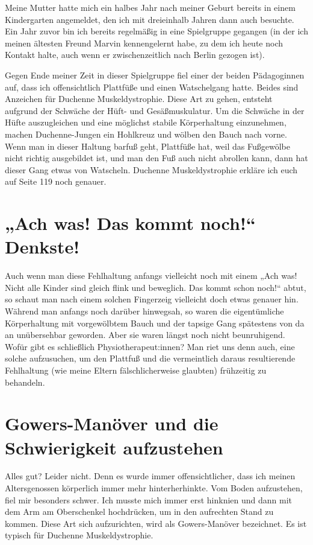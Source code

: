 \documentclass[fontsize=12pt,a4paper,headinclude,DIV=calc,automark]{scrbook}
\begin{document}
Meine Mutter hatte mich ein halbes Jahr nach meiner Geburt bereits in einem Kindergarten angemeldet, den ich mit dreieinhalb Jahren dann auch besuchte. Ein Jahr zuvor bin ich bereits regelmäßig in eine Spielgruppe gegangen (in der ich meinen ältesten Freund Marvin kennengelernt habe, zu dem ich heute noch Kontakt halte, auch wenn er zwischenzeitlich nach Berlin gezogen ist).

Gegen Ende meiner Zeit in dieser Spielgruppe fiel einer der beiden Pädagoginnen auf, dass ich offensichtlich Plattfüße und einen Watschelgang hatte. Beides sind Anzeichen für Duchenne Muskeldystrophie. Diese Art zu gehen, entsteht aufgrund der Schwäche der Hüft- und Gesäßmuskulatur. Um die Schwäche in der Hüfte auszugleichen und eine möglichst stabile Körperhaltung einzunehmen, machen Duchenne-Jungen ein Hohlkreuz und wölben den Bauch nach vorne. Wenn man in dieser Haltung barfuß geht, Plattfüße hat, weil das Fußgewölbe nicht richtig ausgebildet ist, und man den Fuß auch nicht abrollen kann, dann hat dieser Gang etwas von Watscheln. Duchenne Muskeldystrophie erkläre ich euch auf Seite 119 noch genauer.

\section{„Ach was! Das kommt noch!“ Denkste!}

Auch wenn man diese Fehlhaltung anfangs vielleicht noch mit einem „Ach was! Nicht alle Kinder sind gleich flink und beweglich. Das kommt schon noch!“ abtut, so schaut man nach einem solchen Fingerzeig vielleicht doch etwas genauer hin. Während man anfangs noch darüber hinwegsah, so waren die eigentümliche Körperhaltung mit vorgewölbtem Bauch und der tapsige Gang spätestens von da an unübersehbar geworden. Aber sie waren längst noch nicht beunruhigend. Wofür gibt es schließlich Physiotherapeut:innen? Man riet uns denn auch, eine solche aufzusuchen, um den Plattfuß und die vermeintlich daraus resultierende Fehlhaltung (wie meine Eltern fälschlicherweise glaubten) frühzeitig zu behandeln.
              
\section{Gowers-Manöver und die Schwierigkeit aufzustehen}

Alles gut? Leider nicht. Denn es wurde immer offensichtlicher, dass ich meinen Altersgenossen körperlich immer mehr hinterherhinkte. Vom Boden aufzustehen, fiel mir besonders schwer. Ich musste mich immer erst hinknien und dann mit dem Arm am Oberschenkel hochdrücken, um in den aufrechten Stand zu kommen. Diese Art sich aufzurichten, wird als Gowers-Manöver bezeichnet. Es ist typisch für Duchenne Muskeldystrophie.
\end{document}
